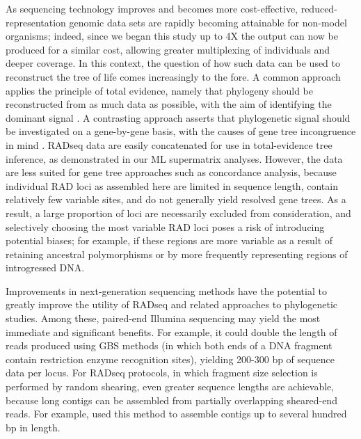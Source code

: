 \documentclass[12pt,letterpaper]{article}
\begin{document}
As sequencing technology improves and becomes more cost-effective,
reduced-representation genomic data sets are rapidly becoming
attainable for non-model organisms; 
indeed, since we began this study
up to 4X the output can now be produced for a similar cost, 
allowing greater multiplexing of individuals
and deeper coverage. 
In this context, the question of
how such data can be used to reconstruct the tree of life comes
increasingly to the fore. A common approach applies the principle of
total evidence, namely that phylogeny should be reconstructed from as
much data as possible, with the aim of identifying the dominant signal
\citep[e.g.,][]{kluge_concern_1989}. A contrasting approach asserts
that phylogenetic signal should be investigated on a gene-by-gene
basis, with the causes of gene tree incongruence in mind
\citep[e.g.,][]{rannala_phylogenetic_2008}. RADseq data are easily
concatenated for use in total-evidence tree inference, as demonstrated
in our ML supermatrix analyses. However, the data are less suited for
gene tree approaches such as concordance analysis, because individual
RAD loci as assembled here are limited in sequence length, contain
relatively few variable sites, and do not generally yield resolved
gene trees. As a result, a large proportion of loci are necessarily
excluded from consideration, and selectively choosing the most variable 
RAD loci poses a risk of introducing potential biases; 
for example, if these regions are more variable as a result
of retaining ancestral polymorphisms or by more frequently 
representing regions of introgressed DNA. 

Improvements in next-generation sequencing methods have
  the potential to greatly improve the utility of RADseq and related
  approaches to phylogenetic studies. Among these, paired-end Illumina
  sequencing may yield the most immediate and significant benefits.
  For example, it could double the length of reads produced using GBS
  methods (in which both ends of a DNA fragment contain restriction
  enzyme recognition sites), yielding 200-300 bp of sequence data per
  locus. For RADseq protocols, in which fragment size selection is
  performed by random shearing, even greater sequence lengths are
  achievable, because long contigs can be assembled from partially
  overlapping sheared-end reads. For example, \cite{etter_local_2011}
  used this method to assemble contigs up to several hundred bp in
  length.
\end{document}
